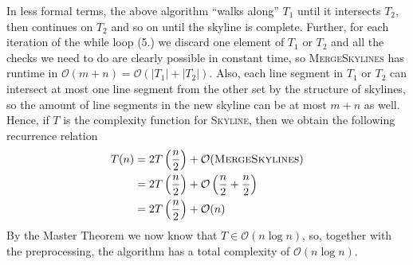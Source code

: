 \documentclass[english, fontsize=12pt, paper=a4, twoside=false, draft=true, pagesize=auto, version=last, DIV=16]{scrartcl}
\theoremstyle{break}
\newcommand*\bigO{\mathcal{O}}
\begin{document}
In less formal terms, the above algorithm \enquote{walks along} $T_1$ until it intersects
$T_2$, then continues on $T_2$ and so on until the skyline is complete. Further, for each
iteration of the while loop (5.) we discard one element of $T_1$ or $T_2$ and all the
checks we need to do are clearly possible in constant time, so \textsc{MergeSkylines} has
runtime in $\bigO(m+n) = \bigO(|T_1|+|T_2|)$. Also, each line segment in $T_1$ or $T_2$
can intersect at most one line segment from the other set by the structure of skylines, so
the amount of line segments in the new skyline can be at most $m+n$ as well. Hence, if $T$
is the complexity function for \textsc{Skyline}, then we obtain the following recurrence
relation
\begin{align*}
  T(n) &= 2 T\left(\frac n2\right) + \bigO(\text{\textsc{MergeSkylines}}) \\
       &= 2 T\left(\frac n2\right) + \bigO\left(\frac n2 + \frac n2\right) \\
       &= 2 T\left(\frac n2\right) + \bigO(n)
\end{align*}
By the Master Theorem we now know that $T \in \bigO(n\log n)$, so, together with the
preprocessing, the algorithm has a total complexity of $\bigO(n\log n)$.

\newpage
\end{document}
